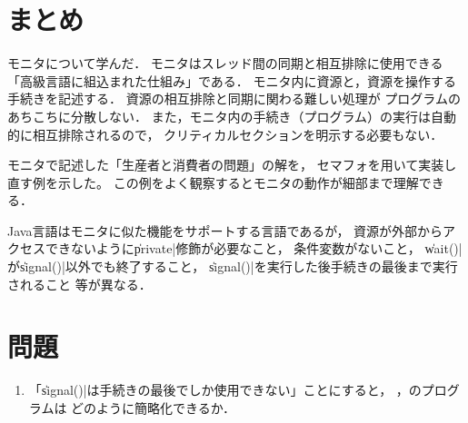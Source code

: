 \section{まとめ}
モニタについて学んだ．
モニタはスレッド間の同期と相互排除に使用できる
「高級言語に組込まれた仕組み」である．
モニタ内に資源と，資源を操作する手続きを記述する．
資源の相互排除と同期に関わる難しい処理が
プログラムのあちこちに分散しない．
また，モニタ内の手続き（プログラム）の実行は自動的に相互排除されるので，
クリティカルセクションを明示する必要もない．

モニタで記述した「生産者と消費者の問題」の解を，
セマフォを用いて実装し直す例を示した。
この例をよく観察するとモニタの動作が細部まで理解できる．

Java言語はモニタに似た機能をサポートする言語であるが，
資源が外部からアクセスできないように\|private|修飾が必要なこと，
条件変数がないこと，
\|wait()|が\|signal()|以外でも終了すること，
\|signal()|を実行した後手続きの最後まで実行されること
等が異なる．


\section*{問題}
\begin{enumerate}
\item 「\|signal()|は手続きの最後でしか使用できない」ことにすると，
，のプログラムは
どのように簡略化できるか．
\end{enumerate}
